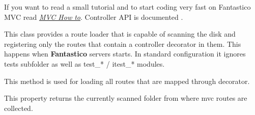 \documentclass[letterpaper,10pt,english]{sphinxmanual}
\begin{document}
If you want to read a small tutorial and to start coding very fast on Fantastico MVC read {\hyperref[how_to/mvc_how_to::doc]{\emph{MVC How to}}}. Controller
API is documented .

\begin{fulllineitems}
\label{features/mvc:fantastico.mvc.controller_registrator.ControllerRouteLoader}
This class provides a route loader that is capable of scanning the disk and registering only the routes that
contain a controller decorator in them. This happens when \textbf{Fantastico} servers starts. In standard configuration
it ignores tests subfolder as well as test\_* / itest\_* modules.

\begin{fulllineitems}
\label{features/mvc:fantastico.mvc.controller_registrator.ControllerRouteLoader.load_routes}
This method is used for loading all routes that are mapped through
{\hyperref[features/mvc:fantastico.mvc.controller_decorators.Controller]{}} decorator.

\end{fulllineitems}


\begin{fulllineitems}
\label{features/mvc:fantastico.mvc.controller_registrator.ControllerRouteLoader.scanned_folder}
This property returns the currently scanned folder from where mvc routes are collected.

\end{fulllineitems}


\end{fulllineitems}

\end{document}
